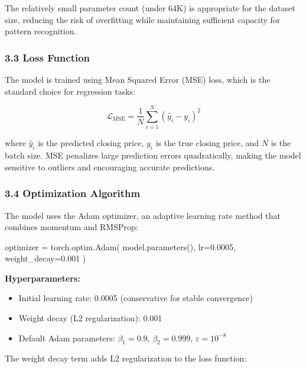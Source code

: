 \documentclass[
]{article}
\newenvironment{Shaded}{}{}
\newcommand{\FloatTok}[1]{\textcolor[rgb]{0.25,0.63,0.44}{#1}}
\newcommand{\NormalTok}[1]{#1}
\newcommand{\OperatorTok}[1]{\textcolor[rgb]{0.40,0.40,0.40}{#1}}
\begin{document}
The relatively small parameter count (under 64K) is appropriate for the
dataset size, reducing the risk of overfitting while maintaining
sufficient capacity for pattern recognition.

\subsubsection{3.3 Loss Function}\label{33-loss-function}

The model is trained using Mean Squared Error (MSE) loss, which is the
standard choice for regression tasks:

\[\mathcal{L}_{\text{MSE}} = \frac{1}{N} \sum_{i=1}^{N} (\hat{y}_i - y_i)^2\]

where $\hat{y}_i$ is the predicted closing price, $y_i$ is the true closing price, and $N$ is the batch size. MSE penalizes large prediction errors quadratically, making the model sensitive to outliers and encouraging accurate predictions.

\subsubsection{3.4 Optimization
Algorithm}\label{34-optimization-algorithm}

The model uses the Adam optimizer, an adaptive learning rate method that
combines momentum and RMSProp:

\begin{Shaded}
\begin{Highlighting}[]
\NormalTok{optimizer }\OperatorTok{=}\NormalTok{ torch.optim.Adam(}
\NormalTok{    model.parameters(),}
\NormalTok{    lr}\OperatorTok{=}\FloatTok{0.0005}\NormalTok{,}
\NormalTok{    weight\_decay}\OperatorTok{=}\FloatTok{0.001}
\NormalTok{)}
\end{Highlighting}
\end{Shaded}

\textbf{Hyperparameters:}

\begin{itemize}
\item
  Initial learning rate: 0.0005 (conservative for stable convergence)
\item
  Weight decay (L2 regularization): 0.001
\item
  Default Adam parameters: $\beta_1=0.9$, $\beta_2=0.999$, $\varepsilon=10^{-8}$
\end{itemize}

The weight decay term adds L2 regularization to the loss function:
\end{document}
